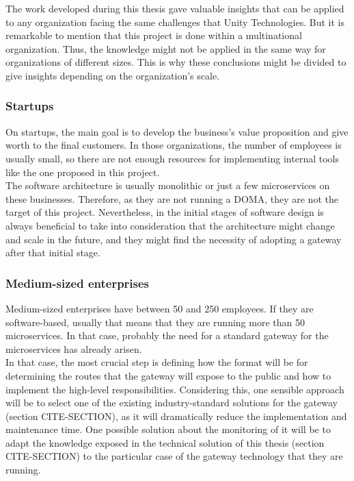\documentclass[english, 12pt, a4paper, sci, utf8, a-1b, online]{aaltothesis}
\begin{document}
The work developed during this thesis gave valuable insights that can be applied to any organization facing the same challenges that Unity Technologies. But it is remarkable to mention that this project is done within a multinational organization. Thus, the knowledge might not be applied in the same way for organizations of different sizes. This is why these conclusions might be divided to give insights depending on the organization's scale.

\subsubsection*{Startups}
On startups, the main goal is to develop the business's value proposition and give worth to the final customers. In those organizations, the number of employees is usually small, so there are not enough resources for implementing internal tools like the one proposed in this project.\\

The software architecture is usually monolithic or just a few microservices on these businesses. Therefore, as they are not running a DOMA, they are not the target of this project. Nevertheless, in the initial stages of software design is always beneficial to take into consideration that the architecture might change and scale in the future, and they might find the necessity of adopting a gateway after that initial stage.

\subsubsection*{Medium-sized enterprises}
Medium-sized enterprises have between 50 and 250 employees. If they are software-based, usually that means that they are running more than 50 microservices. In that case, probably the need for a standard gateway for the microservices has already arisen.\\

In that case, the most crucial step is defining how the format will be for determining the routes that the gateway will expose to the public and how to implement the high-level responsibilities. Considering this, one sensible approach will be to select one of the existing industry-standard solutions for the gateway (section CITE-SECTION), as it will dramatically reduce the implementation and maintenance time. One possible solution about the monitoring of it will be to adapt the knowledge exposed in the technical solution of this thesis (section CITE-SECTION) to the particular case of the gateway technology that they are running.
\end{document}

